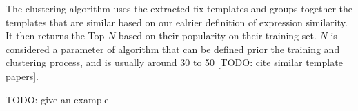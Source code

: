 The clustering algorithm uses the extracted fix templates and groups together
the templates that are similar based on our ealrier definition of expression
similarity. It then returns the Top-$N$ based on their popularity on their
training set. $N$ is considered a parameter of algorithm that can be defined
prior the training and clustering process, and is usually around 30 to 50 [TODO:
cite similar template papers].

TODO: give an example
